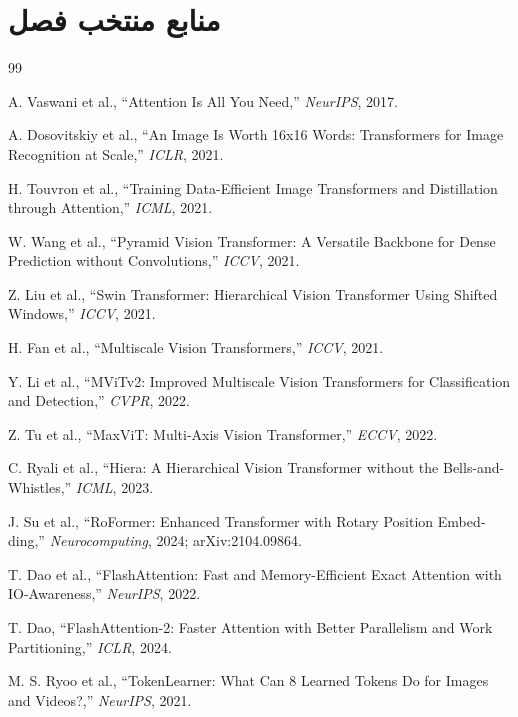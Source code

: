 \documentclass[12pt,openany,oneside]{book}
\begin{document}
\chapter*{منابع منتخب فصل}
\begin{latin}
\begin{thebibliography}{99}

A. Vaswani et al.,
``Attention Is All You Need,''
\emph{NeurIPS}, 2017.

A. Dosovitskiy et al.,
``An Image Is Worth 16x16 Words: Transformers for Image Recognition at Scale,''
\emph{ICLR}, 2021.

H. Touvron et al.,
``Training Data-Efficient Image Transformers and Distillation through Attention,''
\emph{ICML}, 2021.

W. Wang et al.,
``Pyramid Vision Transformer: A Versatile Backbone for Dense Prediction without Convolutions,''
\emph{ICCV}, 2021.

Z. Liu et al.,
``Swin Transformer: Hierarchical Vision Transformer Using Shifted Windows,''
\emph{ICCV}, 2021.

H. Fan et al.,
``Multiscale Vision Transformers,''
\emph{ICCV}, 2021.

Y. Li et al.,
``MViTv2: Improved Multiscale Vision Transformers for Classification and Detection,''
\emph{CVPR}, 2022.

Z. Tu et al.,
``MaxViT: Multi-Axis Vision Transformer,''
\emph{ECCV}, 2022.

C. Ryali et al.,
``Hiera: A Hierarchical Vision Transformer without the Bells-and-Whistles,''
\emph{ICML}, 2023.

J. Su et al.,
``RoFormer: Enhanced Transformer with Rotary Position Embedding,''
\emph{Neurocomputing}, 2024; arXiv:2104.09864.

T. Dao et al.,
``FlashAttention: Fast and Memory-Efficient Exact Attention with IO-Awareness,''
\emph{NeurIPS}, 2022.

T. Dao,
``FlashAttention-2: Faster Attention with Better Parallelism and Work Partitioning,''
\emph{ICLR}, 2024.

M. S. Ryoo et al.,
``TokenLearner: What Can 8 Learned Tokens Do for Images and Videos?,''
\emph{NeurIPS}, 2021.


\end{thebibliography}
\end{latin}
\end{document}
